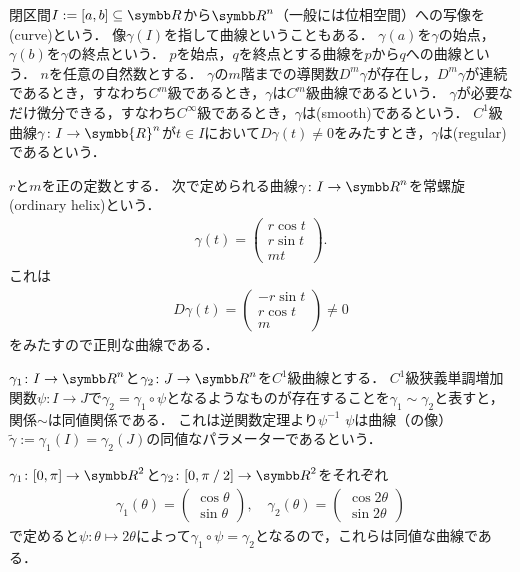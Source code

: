 \documentclass{ltjsbook}
\begin{document}

閉区間\(I := [a, b] \subseteq {\Real}\)から\({\Real}^n\)（一般には位相空間）への写像を(curve)という．
像\(\gamma(I)\)を指して曲線ということもある．
\(\gamma(a)\)を\(\gamma\)の始点，\(\gamma(b)\)を\(\gamma\)の終点という．
\(p\)を始点，\(q\)を終点とする曲線を\(p\)から\(q\)への曲線という．
\(n\)を任意の自然数とする．
\(\gamma\)の\(m\)階までの導関数\(D^m \gamma\)が存在し，\(D^m \gamma\)が連続であるとき，すなわち\(C^m\)級であるとき，\(\gamma\)は\(C^m\)級曲線であるという．
\(\gamma\)が必要なだけ微分できる，すなわち\(C^\infty\)級であるとき，\(\gamma\)は(smooth)であるという．
\(C^1\)級曲線\(\gamma\colon I \to \symbb{R}^n\)が\(t \in I\)において\(D\gamma(t) \neq 0\)をみたすとき，\(\gamma\)は(regular)であるという．

\begin{example} \(r\)と\(m\)を正の定数とする．
次で定められる曲線\(\gamma \colon I \to {\Real}^n\)を常螺旋(ordinary helix)という．
\begin{align*}
    \gamma(t) = \begin{pmatrix}
        r \cos t \\
        r \sin t \\
        m t
    \end{pmatrix}.
\end{align*}
これは
\begin{align*}
    D\gamma(t) = \begin{pmatrix}
        - r \sin t \\
        r \cos t \\
        m
    \end{pmatrix} \neq 0
\end{align*}
をみたすので正則な曲線である．
\end{example}

\(\gamma_1 \colon I \to {\Real}^n\)と\(\gamma_2 \colon J \to {\Real}^n\)を\(C^1\)級曲線とする．
\(C^1\)級狭義単調増加関数\(\psi \colon I \to J\)で\(\gamma_2 = \gamma_1 \circ \psi\)となるようなものが存在することを\(\gamma_1 \sim \gamma_2\)と表すと，関係\(\sim\)は同値関係である．
これは逆関数定理より\(\psi^{-1}\)
\(\psi\)は曲線（の像）\(\tilde{\gamma} := \gamma_1(I) = \gamma_2(J)\)の同値なパラメーターであるという．

\begin{example} \(\gamma_1 \colon [0, \pi] \to {\Real}^2\)と\(\gamma_2 \colon [0, \inlinefrac{\pi}{2}] \to {\Real}^2\)をそれぞれ
\begin{align*}
    \gamma_1(\theta) = \begin{pmatrix}
        \cos \theta \\
        \sin \theta
    \end{pmatrix},
    \quad
    \gamma_2(\theta) = \begin{pmatrix}
        \cos 2 \theta \\
        \sin 2 \theta
    \end{pmatrix}
\end{align*}
で定めると\(\psi \colon \theta \mapsto 2 \theta\)によって\(\gamma_1 \circ \psi = \gamma_2\)となるので，これらは同値な曲線である．
\end{example}
\end{document}
